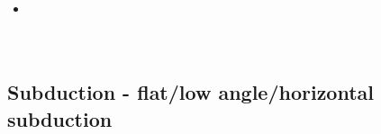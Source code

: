 \begin{scriptsize}
\begin{itemize}
\textcite{kndc21} \\ 
\textcite{roac21} \\
\textcite{vasg21} \\
\textcite{basg21} \\
\textcite{zhwa21} \\
\textcite{zhzl21} \\
\textcite{auwy21} \\
\textcite{laar21} \\
\item[\twothousandtwentytwo] 
\textcite{zhli22} \\
\textcite{auyd22} \\
\textcite{alrr22a} 
\textcite{shgv22} \\
\end{itemize}
\end{scriptsize}

\subsection{Subduction - flat/low angle/horizontal subduction}


